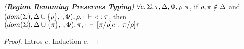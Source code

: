 \begin{lemma}
\emph{(\textbf{Region Renaming Preserves Typing})}
\label{thm:fb-renaming}
$\forall e, \Sigma, \tau, \Delta, \Phi, \rho, \pi$, if $\rho,\pi \notin
\Delta$ and $(dom(\Sigma),\Delta \cup \{\rho\},\cdot,\Phi), \rho, \cdot\,\vdash\,e:\tau$, 
then $(dom(\Sigma),\Delta \cup \{\pi\},\cdot,\Phi),\pi, \cdot\,\vdash\,[\pi/\rho]e:[\pi/\rho]\tau$
\end{lemma}
\begin{proof}
  Intros $e$. Induction $e$.
\end{proof}
